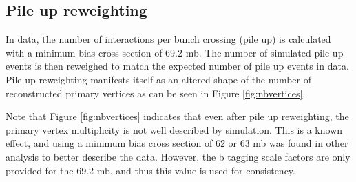 \subsection*{Pile up reweighting}
In data, the number of interactions per bunch crossing (pile up) is calculated with a minimum bias cross section of 69.2 mb. The number of simulated pile up events is then reweighed to match the expected number of pile up events in data. Pile up reweighting manifests itself as an altered shape of the number of reconstructed primary vertices as can be seen in Figure \ref{fig:nbvertices}.
%

Note that Figure \ref{fig:nbvertices} indicates that even after pile up reweighting, the primary vertex multiplicity is not well described by simulation. This is a known effect, and using  a minimum bias cross section of 62 or 63 mb was found in other analysis to better describe the data. However, the b tagging scale factors are only provided for the 69.2 mb, and thus this value is used for consistency.


